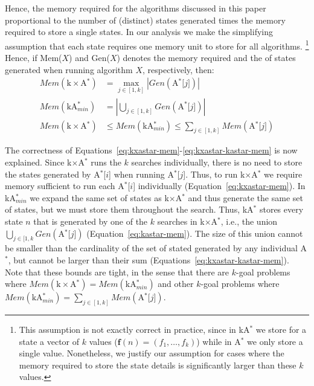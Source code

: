 \documentclass{aicom2e}
\newcommand{\astar}{A$^*$}
\newcommand{\kastar}{kA$^*$}
\newcommand{\kastarmin}{kA$^*_{min}$}
\newcommand{\kxastar}{k$\times$A$^*$}
\newcommand{\astari}[1]{A$^*$[$#1$]}
\begin{document}
Hence, the memory required for the algorithms discussed in this paper
proportional to the number of (distinct) states generated times the memory
required to store a single states.
In our analysis we make the simplifying assumption that each state requires one
memory unit to store for all algorithms. \footnote{This assumption is not
exactly correct in practice, since in \kastar{} we store for a state a vector
of $k$ values ($\textbf{f}(n)=(f_1,\ldots,f_k)$)  while in \astar{} we only
store a single value. Nonetheless, we justify our assumption for cases where
the memory required to store the state details is significantly larger than
these $k$ values.} Hence, if Mem($X$) and Gen($X$) denotes the memory required
and the of states generated when running algorithm $X$, respectively, then:
\begin{align}
Mem(\text{\kxastar{}})&=\max_{j\in [1,k]}| Gen(\text{\astari{j}})| \label{eq:kxastar-mem}\\
Mem(\text{\kastarmin{}})&=|\bigcup_{j\in [1,k]} Gen(\text{\astari{j}})| \label{eq:kastar-mem}\\
Mem(\text{\kxastar{}})&\leq Mem(\text{\kastarmin{}}) \leq \sum_{j\in[1,k]} Mem(\text{\astari{j}}) \label{eq:kxastar-kastar-mem}
\end{align}

The correctness of Equations~\ref{eq:kxastar-mem}-\ref{eq:kxastar-kastar-mem}
is now explained. Since \kxastar{} runs the $k$ searches individually, there is
no need to store the states generated by \astari{i} when running \astari{j}.
Thus, to run \kxastar{} we require memory sufficient to run each \astari{i}
individually (Equation~\ref{eq:kxastar-mem}). In \kastarmin{} we expand the
same set of states as \kxastar{} and thus generate the same set of states, but
we must store them throughout the search. Thus, \kastar{} stores every state
$n$ that is  generated by one of the $k$ searches in \kxastar{}, i.e., the
union $\bigcup_{j\in[1,k}Gen(\text{\astari{j}})$
(Equation~\ref{eq:kastar-mem}). The size of this union cannot be smaller than
the cardinality of the set of stated generated by any individual \astar{}, but
cannot be larger than their sum (Equations~\ref{eq:kxastar-kastar-mem}). Note
that these bounds are tight, in the sense that there are $k$-goal problems
where $Mem(\text{\kxastar{}}) = Mem(\text{\kastarmin{}})$ and other $k$-goal
problems where $Mem(\text{\kastarmin{}}) = \sum_{j\in[1,k]}
Mem(\text{\astari{j}})$.
\end{document}
